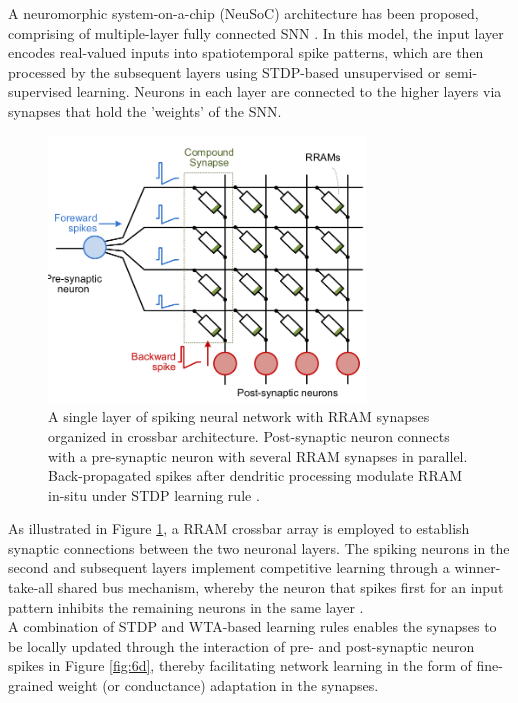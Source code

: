 \noindent A neuromorphic system-on-a-chip (NeuSoC) architecture has been proposed, comprising of multiple-layer fully connected SNN \cite{kheradpisheh2018stdp}. In this model, the input layer encodes real-valued inputs into spatiotemporal spike patterns, which are then processed by the subsequent layers using STDP-based unsupervised or semi-supervised learning. Neurons in each layer are connected to the higher layers via synapses that hold the 'weights' of the SNN.\\


\begin{figure}[htbp!] 
    \centering    
    \includegraphics[width=0.75\textwidth]{Chapter6/Figs/e.png}
    \caption[A single layer of spiking neural network with RRAM synapses organized in crossbar architecture.]{A single layer of spiking neural network with RRAM synapses organized in crossbar architecture. Post-synaptic neuron connects with a pre-synaptic neuron with several RRAM synapses in parallel. Back-propagated spikes after dendritic processing modulate RRAM in-situ under STDP learning rule \cite{wu2018dendritic}.}
    \label{fig:6e}
\end{figure}


\noindent As illustrated in Figure \ref{fig:6e}, a RRAM crossbar array is employed to establish synaptic connections between the two neuronal layers. The spiking neurons in the second and subsequent layers implement competitive learning through a winner-take-all shared bus mechanism, whereby the neuron that spikes first for an input pattern inhibits the remaining neurons in the same layer \cite{markram2012spike}.\\

\noindent A combination of STDP and WTA-based learning rules enables the synapses to be locally updated through the interaction of pre- and post-synaptic neuron spikes in Figure \ref{fig:6d}, thereby facilitating network learning in the form of fine-grained weight (or conductance) adaptation in the synapses. \\

